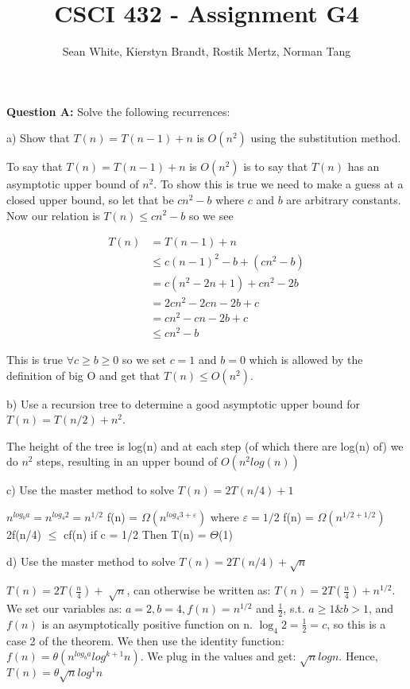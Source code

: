 \documentclass[12pt]{article}
\author{Sean White, Kierstyn Brandt, Rostik Mertz, Norman Tang}
\title{CSCI 432 - Assignment G4}
\begin{document}
\maketitle

\noindent
\textbf{Question A:} Solve the following recurrences: \smallskip

a) Show that $T(n) = T(n - 1) + n$ is $O(n^2)$ using the substitution method.\smallskip

To say that $T(n) = T(n - 1) + n$ is $O(n^2)$ is to say that $T(n)$ has an asymptotic upper bound of $n^2$. To show this is true we need to make a guess at a closed upper bound, so let that be $cn^2 - b$ where $c$ and $b$ are arbitrary constants. Now our relation is $T(n) \leq cn^2 -b$ so we see

\begin{align*}
T(n) &= T(n - 1) + n\\
&\leq c(n-1)^2 - b + (cn^2 - b)\\
&= c(n^2 - 2n + 1) + cn^2 -2b\\
&= 2cn^2 - 2cn - 2b + c\\
&= cn^2 - cn - 2b + c\\
&\leq cn^2 - b
\end{align*}

This is true $\forall c \geq b \geq 0$ so we set $c = 1$ and $b = 0$ which is allowed by the definition of big O and get that $T(n) \leq O(n^2)$.
\bigskip

b) Use a recursion tree to determine a good asymptotic upper bound for $T(n) = T(n/2) + n^2$. \smallskip

The height of the tree is log(n) and at each step (of which there are log(n) of) we do $n^2$ steps, resulting in an upper bound of $O(n^2log(n))$ \bigskip

c) Use the master method to solve $T(n) = 2T(n/4) + 1$ \smallskip

 $n^{log_b a} = n^{log_4 2} = n^{1/2}$
 f(n) = $\Omega (n^{log_4 3 + \varepsilon})$ where $\varepsilon = 1/2$
 f(n) = $\Omega (n^{1/2 + 1/2})$ 
 2f(n/4) $\leq$ cf(n) if c = 1/2 
 Then T(n) = $\Theta$(1)
 \bigskip
 
d) Use the master method to solve $T(n) = 2T(n/4) + \sqrt{n}$ \smallskip

$T(n) = 2T(\frac{n}{4})+\sqrt[]{n}$, can otherwise be written as: $T(n) = 2T(\frac{n}{4})+n^{1/2}$. \\
We set our variables as: $a=2, b=4, f(n)=n^{1/2}$ and $\frac{1}{2}$, s.t. $a\geq1$\&$b>1$, and $f(n)$ is an asymptotically positive function on n. $\log_4 2 = \frac{1}{2} = c$, so this is a case 2 of the theorem. We then use the identity function: $f(n) = \theta(n^{log_ba}log^{k+1} n)$.
We plug in the values and get: $\sqrt{n}log n$. Hence, $T(n)= \theta\sqrt{n}log^1n$ 
\bigskip
\end{document}
